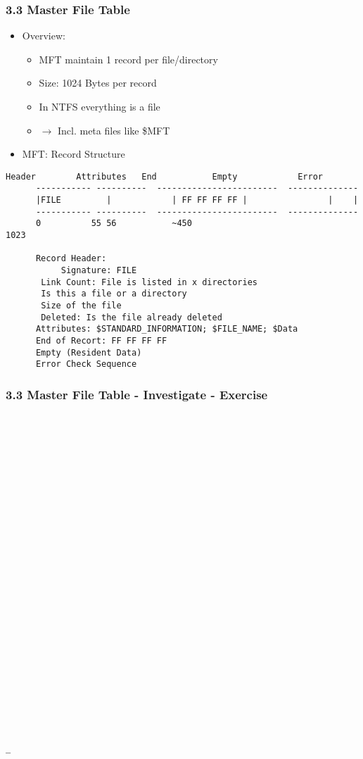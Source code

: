\begin{frame}[fragile]
  \frametitle{3.3 Master File Table}
    \begin{itemize}
    \item Overview:
        \begin{itemize}
	    \item MFT maintain 1 record per file/directory
	    \item Size: 1024 Bytes per record
	    \item In NTFS everything is a file
	    \item[] $\to$ Incl. meta files like \$MFT
        \end{itemize}
    \item MFT: Record Structure
    \end{itemize}
  \begin{lstlisting}[basicstyle=\tiny]
      Header        Attributes   End           Empty            Error
      ----------- ----------  ------------------------  --------------
      |FILE         |            | FF FF FF FF |                |    |
      ----------- ----------  ------------------------  --------------
      0          55 56           ~450                                1023

      Record Header:
           Signature: FILE
	   Link Count: File is listed in x directories
	   Is this a file or a directory
	   Size of the file
	   Deleted: Is the file already deleted
      Attributes: $STANDARD_INFORMATION; $FILE_NAME; $Data
      End of Recort: FF FF FF FF
      Empty (Resident Data)
      Error Check Sequence
  \end{lstlisting}
\end{frame}


\begin{frame}[fragile]
  \frametitle{3.3 Master File Table - Investigate - Exercise}
  \begin{lstlisting}[basicstyle=\tiny]




























_
  \end{lstlisting}
\end{frame}


